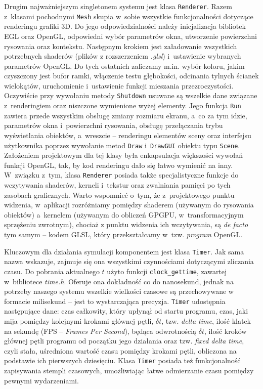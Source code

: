 	Drugim najważniejszym singletonem systemu jest klasa \texttt{Renderer}. Razem z~klasami pochodnymi \texttt{Mesh} skupia w~sobie wszystkie funkcjonalności dotyczące renderingu grafiki 3D. Do jego odpowiedzialności należy inicjalizacja bibliotek EGL oraz OpenGL, odpowiedni wybór parametrów okna, utworzenie powierzchni rysowania oraz kontekstu. Następnym krokiem jest załadowanie wszystkich potrzebnych shaderów (plików z rozszerzeniem \emph{.glsl}) i~ustawienie wybranych parametrów OpenGL. Do tych ostatnich zaliczamy m.in. wybór koloru, jakim czyszczony jest bufor ramki, włączenie testu głębokości, odcinania tylnych ścianek wielokątów, uruchomienie i~ustawienie funkcji mieszania przezroczystości. Oczywiście przy wywołaniu metody \texttt{Shutdown} usuwane są wszelkie dane związane z~renderingiem oraz niszczone wymienione wyżej elementy. Jego funkcja \texttt{Run} zawiera przede wszystkim obsługę zmiany rozmiaru ekranu, a~co za tym idzie, parametrów okna i~powierzchni rysowania, obsługę przełączania trybu wyświetlania obiektów, a~wreszcie -- renderingu elementów sceny oraz interfejsu użytkownika poprzez wywołanie metod \texttt{Draw} i~\texttt{DrawGUI} obiektu typu \texttt{Scene}. Założeniem projektowym dla tej klasy była enkapsulacja większości wywołań funkcji OpenGL, tak, by kod renderingu dało się łatwo wymienić na inny. W~związku z~tym, klasa \texttt{Renderer} posiada także specjalistyczne funkcje do wczytywania shaderów, kerneli i~tekstur oraz zwalniania pamięci po tych zasobach graficznych. Warto wspomnieć o~tym, że z~projektowego punktu widzenia, w~aplikacji rozróżniamy pomiędzy shaderem (używanym do rysowania obiektów) a~kernelem (używanym do obliczeń GPGPU, w~transformacyjnym sprzężeniu zwrotnym), chociaż z punktu widzenia ich wczytywania, są \emph{de facto} tym samym -- kodem GLSL, który przekształcamy w~tzw. \emph{program} OpenGL. 
	
	Kluczowym dla działania symulacji komponentem jest klasa \texttt{Timer}. Jak sama nazwa wskazuje, zajmuje się ona wszystkimi czynnościami dotyczącymi zliczania czasu. Do pobrania aktualnego \(t\) użyto funkcji \texttt{clock\_gettime}, zawartej w~bibliotece \emph{time.h}. Oferuje ona dokładność co do nanosekund, jednak na potrzeby naszego systemu wszelkie wielkości czasowe są przechowywane w formacie milisekund -- jest to wystarczająca precyzja. \texttt{Timer} udostępnia następujące dane: czas całkowity, który upłynął od startu programu, czas, jaki mija pomiędzy kolejnymi krokami głównej pętli, \(\delta t \), tzw. \emph{delta time}, ilość klatek na sekundę (FPS -- \emph{Frames Per Second}), będąca odwrotnością \(\delta t \), ilość kroków głównej pętli programu od początku jego działania oraz tzw. \emph{fixed delta time}, czyli stała, uśredniona wartość czasu pomiędzy krokami pętli, obliczona na podstawie ich pierwszych dziesięciu. Klasa \texttt{Timer} posiada też funkcjonalność zapisywania stempli czasowych, umożliwiając łatwe odmierzanie czasu pomiędzy pewnymi wydarzeniami.
	
